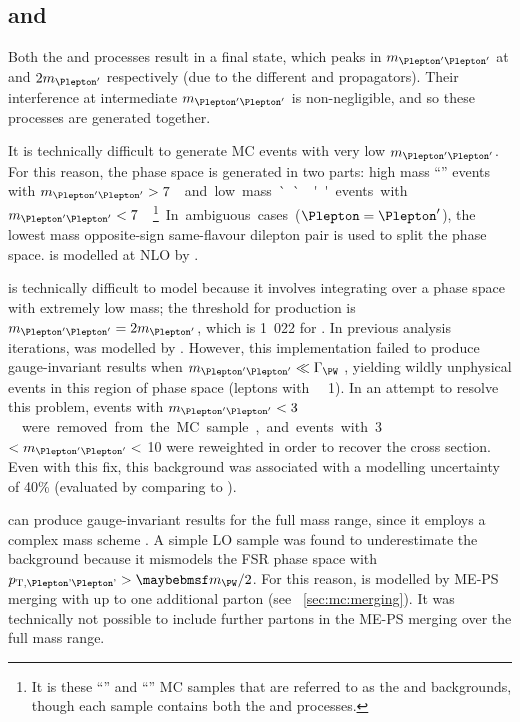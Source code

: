 \subsection{\WZ and \Wgstar}
\label{sec:diboson:wgstar}

Both the \WZ and \Wgstar processes result in a  
final state, which peaks in $m_{\HepProcess{\Plepton'\Plepton'}}$ at \mZ and $2m_{\Plepton'}$ 
respectively (due to the different \PZ and \Pphoton propagators). Their interference at 
intermediate $m_{\HepProcess{\Plepton'\Plepton'}}$ is non-negligible, and so these processes 
are generated together.

It is technically difficult to generate MC events with very low 
$m_{\HepProcess{\Plepton'\Plepton'}}$. For this reason, the phase space is generated in two 
parts: high mass ``\WZ'' events with \unit{$m_{\HepProcess{\Plepton'\Plepton'}} > 7$}{\GeV} 
and low mass ``\Wgstar'' events with 
\unit{$m_{\HepProcess{\Plepton'\Plepton'}} < 7$}{\GeV}.\footnote{
	It is these ``\WZ'' and ``\Wgstar''	MC samples that are referred to as the \WZ and 
	\Wgstar backgrounds, though each sample contains both the \WZ and \Wgstar processes.
}
In ambiguous cases ($\Plepton = \Plepton'$), the lowest mass opposite-sign same-flavour 
dilepton pair is used to split the phase space. \WZ is modelled at NLO by 
.

\Wgstar is technically difficult to model because it involves integrating over a phase space 
with extremely low mass; the threshold for production is $m_{\HepProcess{\Plepton'\Plepton'}} 
= 2m_{\Plepton'}$, which is \unit{1.022}{\MeV} for \HepProcess{\Plepton\Pnu\Pe\Pe}.
In previous analysis iterations, \Wgstar was modelled by  
\cite{HWW-Moriond}. However, this implementation failed to produce gauge-invariant 
results when $m_{\HepProcess{\Plepton'\Plepton'}} \ll \Gamma_{\PW}$ \cite{MadGraph:Wgstar}, 
yielding wildly unphysical events in this region of phase space (\eg leptons with 
\unit{\pt~\about~1}{\TeV}). In an attempt to resolve this problem, events with 
\unit{$m_{\HepProcess{\Plepton'\Plepton'}} < 3$}{\MeV} were removed from the MC sample, and 
events with \unit{3}{\MeV} $< m_{\HepProcess{\Plepton'\Plepton'}} <$ \unit{10}{\MeV} were 
reweighted in order to recover the cross section. Even with this fix, this background was 
associated with a modelling uncertainty of 40\% (evaluated by comparing to \sherpa).

\sherpa can produce gauge-invariant results for the full mass range, since it employs a 
complex mass scheme \cite{Sherpa:Wgstar}. A simple LO \sherpa sample was found to 
underestimate the \Wgstar background because it mismodels the FSR phase space with 
$p_{\text{T,\HepProcess{\Plepton'\Plepton'}}} > \mW/2$. For this reason, \Wgstar is modelled 
by \sherpa ME-PS merging with up to one additional parton (see \Section~\ref{sec:mc:merging}).
It was technically not possible to include further partons in the ME-PS merging over the 
full mass range.

